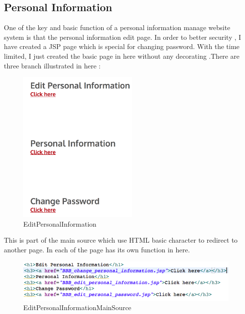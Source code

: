 \documentclass[12pt]{article}
\begin{document}
\subsection{Personal Information}
One of the key and basic function of a personal information manage website system is that the personal information edit page. In order to better security , I have created a JSP page which is special for changing password. With the time limited, I just created the basic  page in here without any decorating .There are three branch illustrated in here :
\begin{figure}[H]
	\centering	
	\includegraphics[height=3in]{images/EditPersonalInformation.jpg}

	
	\caption[EditPersonalInformation]{EditPersonalInformation}
	\label{fig:EditPersonalInformation}
\end{figure}


This is part of the main source which use HTML basic character to redirect to another page. In each of the page has its own function in here.
\begin{figure}[H]
	\centering	

	\includegraphics[width=15cm]{images/EditPersonalInformationMainSource.jpg}

	\caption[EditPersonalInformationMainSource]{EditPersonalInformationMainSource}
	\label{fig:EditPersonalInformationMainSource}
\end{figure}

\newpage
\end{document}

